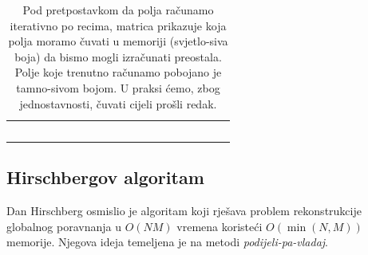 \documentclass[times, utf8, zavrsni]{fer}
\begin{document}
\begin{table}
\centering
\begin{tabularx}{400pt}{|R|R|R|R|R|R|R|R|R|R|R|R|R|R|R|R|R|R|R|R|}
 \hline
  &  &  &  &  &  &  &  &  &  &  &  &  &  &  &  &  &  &  &  \\ \hline
  &  &  &  &  &  &  &  &  &  &  &  &  &  &  &  &  &  &  &  \\ \hline
  &  &  &  &  &  &  &  &  &  &  &  &  &  &  &  &  &  &  &  \\ \hline
  &  &  &  &  &  &  &  &   &   &   &   &   &   &   &   &   &   &   &   \\ \hline
   &   &   &   &   &   &   &   &   &   &  &  &  &  &  &  &  &  &  &  \\ \hline
  &  &  &  &  &  &  &  &  &  &  &  &  &  &  &  &  &  &  &  \\ \hline
\end{tabularx}
\caption[Memorijska optimizacija]{Pod pretpostavkom da polja računamo iterativno 
po recima, matrica prikazuje koja polja moramo čuvati u
memoriji (svjetlo-siva boja) da bismo mogli izračunati preostala.
Polje koje trenutno računamo
pobojano je tamno-sivom bojom. U praksi ćemo, zbog jednostavnosti,
čuvati cijeli prošli redak.}
\label{table:memopt}
\end{table}

\subsection{Hirschbergov algoritam}
Dan Hirschberg osmislio je algoritam koji rješava problem rekonstrukcije
globalnog poravnanja u $O(NM)$ vremena koristeći $O(\min(N, M))$ memorije.
Njegova ideja temeljena je na metodi \textit{podijeli-pa-vladaj}.
\end{document}
